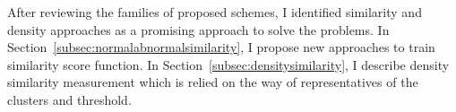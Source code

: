 After reviewing the families of proposed schemes, I identified similarity and density approaches as a promising approach to solve the problems.
\newline
In Section~\ref{subsec:normalabnormalsimilarity}, I propose new approaches to train similarity score function.\newline
In Section~\ref{subsec:densitysimilarity}, I describe density similarity measurement which is relied on the way of representatives of the clusters and threshold.\newline
%
